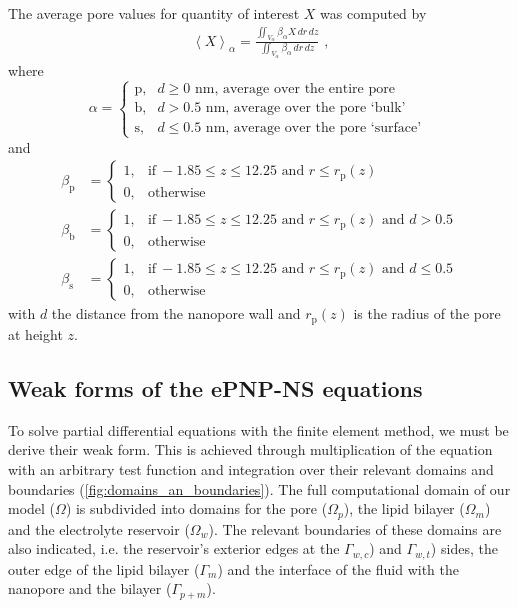 \documentclass[journal=ancac3, manuscript=suppinfo, etalmode=truncate,maxauthors=0]{achemso}
\begin{document}
The average pore values for quantity of interest $X$ was computed by
%
\begin{align}
  \left< X \right>_{\alpha} =
    \displaystyle\frac{\displaystyle\iint_{V_{\alpha}} \beta_{\alpha} X \,dr\,dz}
                      {\displaystyle\iint_{V_{\alpha}} \beta_{\alpha} \,dr\,dz}
  \text{ ,}
\end{align}
%
where
%
\begin{equation}
  \alpha=
  \begin{cases}
    \text{p}, & d \ge 0  \text{~nm} \text{, average over the entire pore} \\
    \text{b}, & d > 0.5  \text{~nm} \text{, average over the pore `bulk' }  \\
    \text{s}, & d \le 0.5\text{~nm} \text{, average over the pore `surface' }
  \end{cases}
\end{equation}
%
and
%
\begin{align}
  \beta_{\text{p}} &=
  \begin{cases}
    1, & \text{if}\ -1.85\le z \le 12.25  \text{ and } r \le r_\text{p}(z) \\
    0, & \text{otherwise}
  \end{cases} \\
  \beta_{\text{b}} &=
  \begin{cases}
  1, & \text{if}\ -1.85\le z \le 12.25  \text{ and } r \le r_\text{p}(z) \text{ and } d > 0.5 \\
  0, & \text{otherwise}
  \end{cases} \\
  \beta_{\text{s}} &=
  \begin{cases}
  1, & \text{if}\ -1.85\le z \le 12.25  \text{ and } r \le r_\text{p}(z) \text{ and } d \le 0.5 \\
  0, & \text{otherwise}
  \end{cases}
\end{align}
%
with $d$ the distance from the nanopore wall and $r_\text{p}(z)$ is the radius of the pore at height $z$.


\newpage
%
\subsection{Weak forms of the ePNP-NS equations}
%
To solve partial differential equations with the finite element method, we must be derive their weak form.
This is achieved through multiplication of the equation with an arbitrary test function and integration over
their relevant domains and boundaries (\cref{fig:domains_an_boundaries}). The full computational domain of our
model ($\Omega$) is subdivided into domains for the pore ($\Omega_p$), the lipid bilayer ($\Omega_m$) and the
electrolyte reservoir ($\Omega_w$). The relevant boundaries of these domains are also indicated, i.e. the
reservoir's exterior edges at the \cisi{} $\Gamma_{w,c}$) and \transi{} $\Gamma_{w,t}$) sides, the outer edge
of the lipid bilayer ($\Gamma_{m}$) and the interface of the fluid with the nanopore and the bilayer
($\Gamma_{p+m}$).
\end{document}
